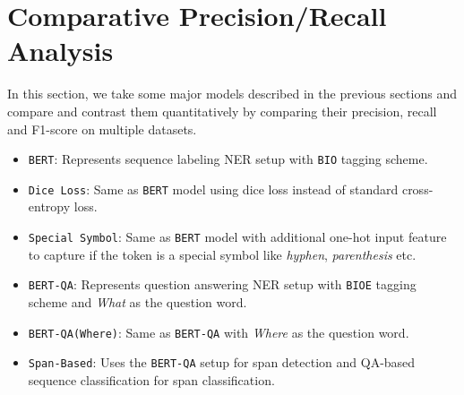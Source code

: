 \section{Comparative Precision/Recall Analysis}
\label{sec:precision_recall_analysis}

In this section, we take some major models described in the previous sections and compare and contrast them quantitatively by comparing their precision, recall and F1-score on multiple datasets.

\begin{itemize}
    \item \texttt{BERT}: Represents sequence labeling NER setup with \texttt{BIO} tagging scheme.
    
    \item \texttt{Dice Loss}: Same as \texttt{BERT} model using dice loss instead of standard cross-entropy loss.
    
    \item \texttt{Special Symbol}: Same as \texttt{BERT} model with additional one-hot input feature to capture if the token is a special symbol like \textit{hyphen}, \textit{parenthesis} etc.
    
    \item \texttt{BERT-QA}: Represents question answering NER setup with \texttt{BIOE} tagging scheme and \textit{What} as the question word.
    
    \item \texttt{BERT-QA(Where)}: Same as \texttt{BERT-QA} with \textit{Where} as the question word.
    
    \item \texttt{Span-Based}: Uses the \texttt{BERT-QA} setup for span detection and QA-based sequence classification for span classification.
\end{itemize}


